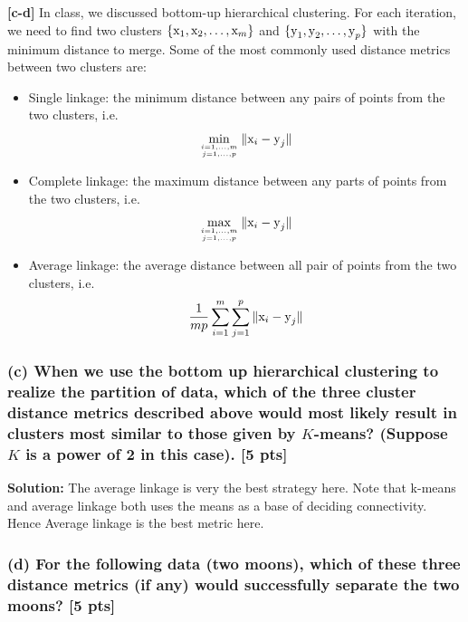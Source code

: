 \documentclass[twoside,10pt]{article}
\begin{document}
\textbf{[c-d]} In class, we discussed bottom-up hierarchical clustering. For each iteration, we need to find two clusters $\{\text x_1, \text x_2, \dots, \text x_m\}$ and $\{\text y_1, \text y_2, \dots, \text y_p\}$ with the minimum distance to merge. Some of the most commonly used distance metrics between two clusters are:
    \begin{itemize}
    \item Single linkage: the minimum distance between any pairs of points from the two clusters, i.e.
    $$\min_{i=1,\dots,m \atop j=1,\dots, p}\|\text x_i - \text y_j\|$$
    \item Complete linkage: the maximum distance between any parts of points from the two clusters, i.e.
    $$\max_{i=1,\dots,m \atop j=1,\dots, p}\|\text x_i - \text y_j\|$$
    \item Average linkage: the average distance between all pair of points from the two clusters, i.e.
    $$\frac{1}{mp}\sum_{i=1}^m\sum_{j=1}^p\|\text x_i - \text y_j\|$$
    \end{itemize}

\subsubsection*{(c) When we use the bottom up hierarchical clustering to realize the partition of data, which of the three cluster distance metrics described above would most likely result in clusters most similar to those given by $K$-means? (Suppose $K$ is a power of 2 in this case). [5 pts]}

\textbf{Solution:}
\hspace{1cm} The average linkage is very the best strategy here. Note that k-means and average linkage both uses the means as a base of deciding connectivity. Hence Average linkage is the best metric here.
\subsubsection*{(d) For the following data (two moons), which of these three distance metrics (if any) would successfully separate the two moons? [5 pts]}
\end{document}
